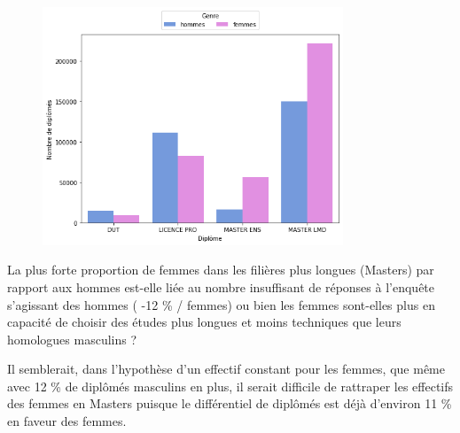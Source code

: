 \documentclass[12pt, a4paper, titlepage, table]{article}
\begin{document}
		\begin{figure}[H]
			\centering
			\includegraphics[width=0.8\textwidth]{../graphs/nombre_diplome_genre.png}
			\label{fig:diplome_genre}
		\end{figure}
	
	La plus forte proportion de femmes dans les filières plus longues (Masters) par rapport aux hommes est-elle liée au nombre insuffisant de réponses à l'enquête s'agissant des hommes ( -12 \% / femmes) ou bien les femmes sont-elles plus en capacité de choisir des études plus longues et moins techniques que leurs homologues masculins ?
	
	Il semblerait, dans l'hypothèse d'un effectif constant pour les femmes, que même avec 12 \% de diplômés masculins en plus, il serait difficile de rattraper les effectifs des femmes en Masters puisque le différentiel de diplômés est déjà d'environ 11 \% en faveur des femmes.      
\end{document}
